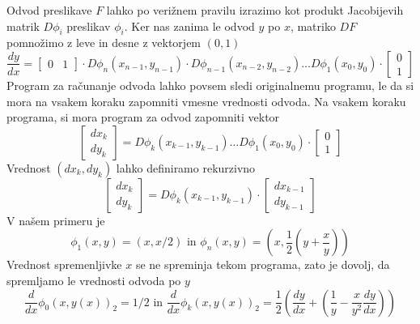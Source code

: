 \documentclass{article}
\begin{document}
Odvod preslikave $F$ lahko po verižnem pravilu izrazimo kot produkt Jacobijevih matrik
$D\phi_i$ preslikav $\phi_i$. Ker nas zanima le odvod $y$ po $x$, matriko $DF$
pomnožimo z leve in desne z vektorjem $(0,1)$ 
\begin{equation}
\label{eq:kompozitum}
  \frac{dy}{dx} =
  \begin{bmatrix}
    0& 1
  \end{bmatrix}
\cdot D\phi_n(x_{n-1},y_{n-1})\cdot D\phi_{n-1}(x_{n-2},y_{n-2})\ldots D\phi_1(x_0,y_0)\cdot
  \begin{bmatrix}
    0\\
    1
  \end{bmatrix} 
\end{equation}
Program za računanje odvoda lahko povsem sledi originalnemu programu, le da si
mora na vsakem koraku zapomniti vmesne vrednosti odvoda. Na vsakem
koraku programa, si mora program za odvod zapomniti vektor
\begin{equation*}
\begin{bmatrix}dx_{k}\\dy_{k}\end{bmatrix} = D\phi_{k}(x_{k-1},y_{k-1})\ldots D\phi_1(x_0,y_0)\cdot \begin{bmatrix} 0\\ 1\end{bmatrix} 
\end{equation*}
Vrednost $(dx_k,dy_k)$ lahko definiramo rekurzivno
\begin{equation}
  \label{eq:rek_odvod}
\begin{bmatrix}dx_{k}\\dy_{k}\end{bmatrix} = D\phi_{k}(x_{k-1},y_{k-1})\cdot \begin{bmatrix} dx_{k-1}\\ dy_{k-1}\end{bmatrix} 
\end{equation}
V našem primeru je 
\begin{equation*}
  \phi_1(x,y)=(x,x/2)\text{ in } \phi_n(x,y)=\left(x,\frac{1}{2}\left( y+\frac{x}{y} \right)\right)
\end{equation*}
Vrednost spremenljivke $x$ se ne spreminja tekom programa, zato je dovolj, da
spremljamo le vrednosti odvoda po $y$
\begin{equation*}
  \frac{d}{dx}\phi_0(x,y(x))_2=1/2\text{ in }\frac{d}{dx}\phi_k(x,y(x))_2=\frac{1}{2}\left( \frac{dy}{dx}+\left(\frac{1}{y}-\frac{x}{y^2}\frac{dy}{dx}\right) \right)
\end{equation*}
 
\end{document}
